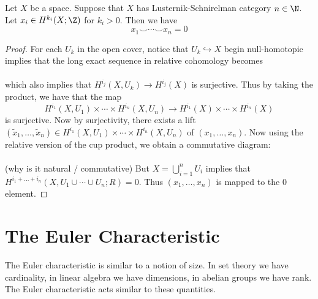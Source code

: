 \documentclass[a4paper]{article}
\begin{document}
\begin{prp}{}{} Let $X$ be a space. Suppose that $X$ has Lusternik-Schnirelman category $n\in\N$. Let $x_i\in H^{k_i}(X;\Z)$ for $k_i>0$. Then we have $$x_1\smile\cdots\smile x_n=0$$ 
\begin{proof}
For each $U_k$ in the open cover, notice that $U_k\hookrightarrow X$ begin null-homotopic implies that the long exact sequence in relative cohomology becomes \\
\\
which also implies that $H^{i_j}(X,U_k)\to H^{i_j}(X)$ is surjective. Thus by taking the product, we have that the map $$H^{i_1}(X,U_1)\times\cdots\times H^{i_n}(X,U_n)\to H^{i_1}(X)\times\cdots\times H^{i_n}(X)$$ is surjective. Now by surjectivity, there exists a lift $(\tilde{x}_1,\dots,\tilde{x}_n)\in H^{i_1}(X,U_1)\times\cdots\times H^{i_n}(X,U_n)$ of $(x_1,\dots,x_n)$. Now using the relative version of the cup product, we obtain a commutative diagram: \\
\\
(why is it natural / commutative) But $X=\bigcup_{i=1}^nU_i$ implies that $H^{i_1+\dots+i_n}(X,U_1\cup\cdots\cup U_n;R)=0$. Thus $(x_1,\dots,x_n)$ is mapped to the $0$ element. 
\end{proof}
\end{prp}

\pagebreak
\section{The Euler Characteristic}
The Euler characteristic is similar to a notion of size. In set theory we have cardinality, in linear algebra we have dimensions, in abelian groups we have rank. The Euler characteristic acts similar to these quantities. 
\end{document}
